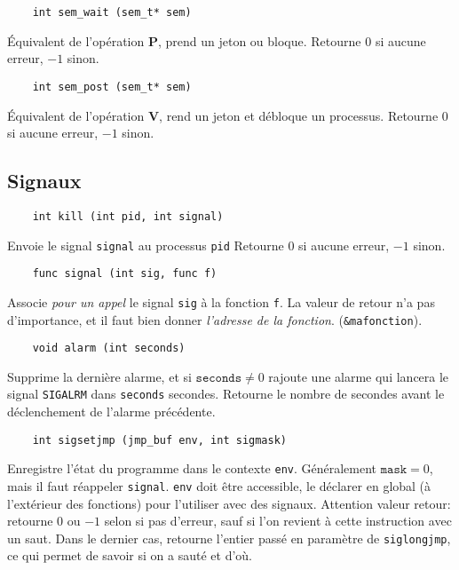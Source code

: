 \documentclass[10pt,twocolumn,a4paper]{article}
\begin{document}
\begin{lstlisting}
    int sem_wait (sem_t* sem)
\end{lstlisting}
\'Equivalent de l'opération \textbf{P}, prend un jeton ou bloque.
Retourne $0$ si aucune erreur, $-1$ sinon.


\begin{lstlisting}
    int sem_post (sem_t* sem)
\end{lstlisting}
\'Equivalent de l'opération \textbf{V}, rend un jeton et débloque un processus.
Retourne $0$ si aucune erreur, $-1$ sinon.

\subsection{Signaux}

\begin{lstlisting}
    int kill (int pid, int signal)
\end{lstlisting}
Envoie le signal \texttt{signal} au processus \texttt{pid}
Retourne $0$ si aucune erreur, $-1$ sinon.

\begin{lstlisting}
    func signal (int sig, func f)
\end{lstlisting}
Associe \emph{pour un appel} le signal \texttt{sig} à la fonction \texttt{f}.
La valeur de retour n'a pas d'importance, et il faut bien donner \emph{l'adresse de la fonction}.
(\texttt{\&mafonction}).

\begin{lstlisting}
    void alarm (int seconds)
\end{lstlisting}
Supprime la dernière alarme, et si $\texttt{seconds} \neq 0$ rajoute une alarme qui lancera le signal \texttt{SIGALRM} dans \texttt{seconds} secondes.
Retourne le nombre de secondes avant le déclenchement de l'alarme précédente.

\begin{lstlisting}
    int sigsetjmp (jmp_buf env, int sigmask)
\end{lstlisting}
Enregistre l'état du programme dans le contexte \texttt{env}. Généralement $\texttt{mask} = 0$, mais il faut réappeler \texttt{signal}.
\texttt{env} doit être accessible, le déclarer en global (à l'extérieur des fonctions) pour l'utiliser avec des signaux.
Attention valeur retour: retourne $0$ ou $-1$ selon si pas d'erreur, sauf si l'on revient à cette instruction avec un saut.
Dans le dernier cas, retourne l'entier passé en paramètre de \texttt{siglongjmp}, ce qui permet de savoir si on a sauté et d'où.
\end{document}

